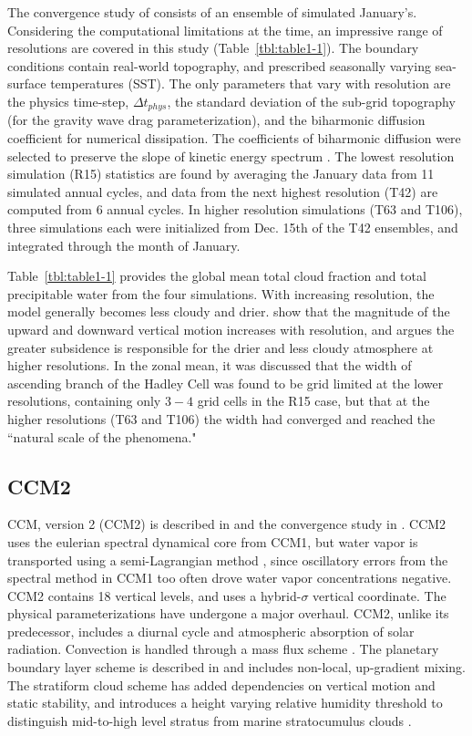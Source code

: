 The convergence study of \cite{KW1991JGR} consists of an ensemble of simulated January's. Considering the computational limitations at the time, an impressive range of resolutions are covered in this study (Table~\ref{tbl:table1-1}). The boundary conditions contain real-world topography, and prescribed seasonally varying sea-surface temperatures (SST). The only parameters that vary with resolution are the physics time-step, $\Delta t_{phys}$, the standard deviation of the sub-grid topography (for the gravity wave drag parameterization), and the biharmonic diffusion coefficient for numerical dissipation. The coefficients of biharmonic diffusion were selected to preserve the slope of kinetic energy spectrum \citep[see][]{B1991JCLIM}. The lowest resolution simulation (R15) statistics are found by averaging the January data from 11 simulated annual cycles, and data from the next highest resolution (T42) are computed from 6 annual cycles. In higher resolution simulations (T63 and T106), three simulations each were initialized from Dec. 15th of the T42 ensembles, and integrated through the month of January.

Table~\ref{tbl:table1-1} provides the global mean total cloud fraction and total precipitable water from the four simulations. With increasing resolution, the model generally becomes less cloudy and drier. \cite{KW1991JGR} show that the magnitude of the upward and downward vertical motion increases with resolution, and argues the greater subsidence is responsible for the drier and less cloudy atmosphere at higher resolutions. In the zonal mean, it was discussed that the width of ascending branch of the Hadley Cell was found to be grid limited at the lower resolutions, containing only $3-4$ grid cells in the R15 case, but that at the higher resolutions (T63 and T106) the width had converged and reached the ``natural scale of the phenomena."

\subsection{CCM2}

CCM, version 2 (CCM2) is described in \cite{CCM2} and the convergence study in \cite{WETAL1995CD}. CCM2 uses the eulerian spectral dynamical core from CCM1, but water vapor is transported using a semi-Lagrangian method \citep{WR1994TELLUS}, since oscillatory errors from the spectral method in CCM1 too often drove water vapor concentrations negative. CCM2 contains 18 vertical levels, and uses a hybrid-$\sigma$ vertical coordinate. The physical parameterizations have undergone a major overhaul. CCM2, unlike its predecessor, includes a diurnal cycle and atmospheric absorption of solar radiation. Convection is handled through a mass flux scheme \citep{H1994JGR}. The planetary boundary layer scheme is described in \cite{HB1993JCLIM} and includes non-local, up-gradient mixing. The stratiform cloud scheme has added dependencies on vertical motion and static stability, and introduces a height varying relative humidity threshold to distinguish mid-to-high level stratus from marine stratocumulus clouds \citep{KETAL1994JGR}.

